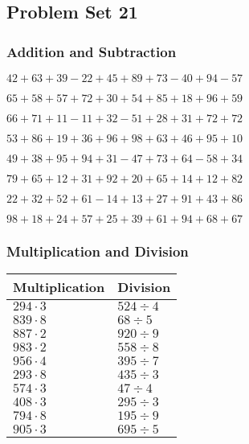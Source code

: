 \hypertarget{problem-set-21}{%
\subsection{Problem Set 21}\label{problem-set-21}}

\hypertarget{addition-and-subtraction}{%
\subsubsection{Addition and
Subtraction}\label{addition-and-subtraction}}

\(42+63+39-22+45+89+73-40+94-57\)

\(65+58+57+72+30+54+85+18+96+59\)

\(66+71+11-11+32-51+28+31+72+72\)

\(53+86+19+36+96+98+63+46+95+10\)

\(49+38+95+94+31-47+73+64-58+34\)

\(79+65+12+31+92+20+65+14+12+82\)

\(22+32+52+61-14+13+27+91+43+86\)

\(98+18+24+57+25+39+61+94+68+67\)

\hypertarget{multiplication-and-division}{%
\subsubsection{Multiplication and
Division}\label{multiplication-and-division}}

\begin{longtable}[]{@{}ll@{}}
\toprule
Multiplication & Division\tabularnewline
\midrule
\endhead
\(294\cdot3\) & \(524÷4\)\tabularnewline
\(839\cdot8\) & \(68÷5\)\tabularnewline
\(887\cdot2\) & \(920÷9\)\tabularnewline
\(983\cdot2\) & \(558÷8\)\tabularnewline
\(956\cdot4\) & \(395÷7\)\tabularnewline
\(293\cdot8\) & \(435÷3\)\tabularnewline
\(574\cdot3\) & \(47÷4\)\tabularnewline
\(408\cdot3\) & \(295÷3\)\tabularnewline
\(794\cdot8\) & \(195÷9\)\tabularnewline
\(905\cdot3\) & \(695÷5\)\tabularnewline
\bottomrule
\end{longtable}
